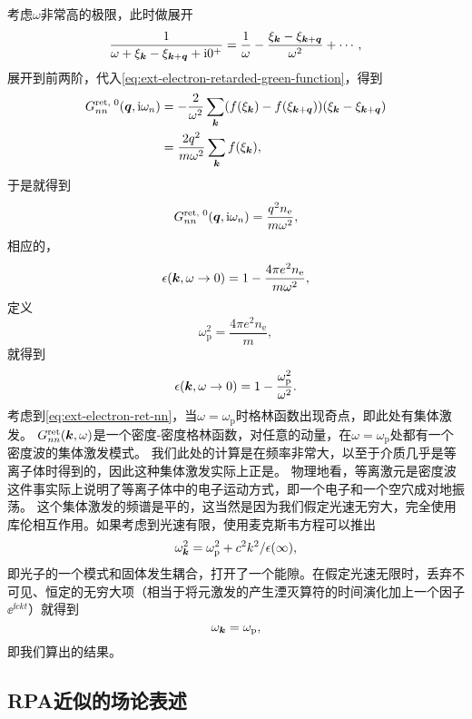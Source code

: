 考虑$\omega$非常高的极限，此时做展开
\[
    \frac{1}{\omega + \xi_{\vb*{k}} - \xi_{\vb*{k} + \vb*{q}} + \mathrm{i} 0^+} = \frac{1}{\omega} - \frac{\xi_{\vb*{k}} - \xi_{\vb*{k} + \vb*{q}}}{\omega^2} + \cdots,
\]
展开到前两阶，代入\eqref{eq:ext-electron-retarded-green-function}，得到
\[
    \begin{aligned}
        G_{nn}^\text{ret, 0}(\vb*{q}, \mathrm{i} \omega_n) &= - \frac{2}{\omega^2} \sum_{\vb*{k}} (f(\xi_{\vb*{k}}) - f(\xi_{\vb*{k} + \vb*{q}})) (\xi_{\vb*{k}} - \xi_{\vb*{k} + \vb*{q}}) \\
        &= \frac{2 q^2}{m \omega^2} \sum_{\vb*{k}} f(\xi_{\vb*{k}}), 
    \end{aligned}
\]
于是就得到
\begin{equation}
    G_{nn}^\text{ret, 0}(\vb*{q}, \mathrm{i} \omega_n) = \frac{q^2 n_\text{e}}{m \omega^2},
\end{equation}
相应的，
\[
    \epsilon(\vb*{k}, \omega \to 0) = 1 - \frac{4 \pi e^2 n_\text{e}}{m \omega^2},
\]
定义
\begin{equation}
    \omega_\text{p}^2 = \frac{4 \pi e^2 n_\text{e}}{m},
\end{equation}
就得到
\begin{equation}
    \epsilon(\vb*{k}, \omega \to 0) = 1 - \frac{\omega_\text{p}^2}{\omega^2}.
\end{equation}
考虑到\eqref{eq:ext-electron-ret-nn}，当$\omega = \omega_\text{p}$时格林函数出现奇点，即此处有集体激发。
$G^\text{ret}_{nn}(\vb*{k}, \omega)$是一个密度-密度格林函数，对任意的动量，在$\omega = \omega_\text{p}$处都有一个密度波的集体激发模式。
我们此处的计算是在频率非常大，以至于介质几乎是等离子体时得到的，因此这种集体激发实际上正是。
物理地看，等离激元是密度波这件事实际上说明了等离子体中的电子运动方式，即一个电子和一个空穴成对地振荡。
这个集体激发的频谱是平的，这当然是因为我们假定光速无穷大，完全使用库伦相互作用。如果考虑到光速有限，使用麦克斯韦方程可以推出
\begin{equation}
    \omega_{\vb*{k}}^2 = \omega_\text{p}^2 + c^2 k^2 / \epsilon(\infty),
\end{equation}
即光子的一个模式和固体发生耦合，打开了一个能隙。在假定光速无限时，丢弃不可见、恒定的无穷大项（相当于将元激发的产生湮灭算符的时间演化加上一个因子$\ee^{\ii c k t}$）就得到
\[
    \omega_{\vb*{k}} = \omega_\text{p},
\]
即我们算出的结果。

\subsection{RPA近似的场论表述}

